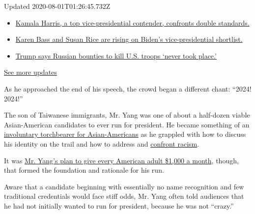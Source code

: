 Updated 2020-08-01T01:26:45.732Z

\begin{itemize}
\tightlist
\item
  \href{https://www.nytimes.com/2020/07/31/us/elections/biden-vs-trump.html?action=click\&pgtype=Article\&state=default\&region=MAIN_CONTENT_1\&context=storylines_live_updates\#link-29fdff45}{Kamala
  Harris, a top vice-presidential contender, confronts double
  standards.}
\item
  \href{https://www.nytimes.com/2020/07/31/us/elections/biden-vs-trump.html?action=click\&pgtype=Article\&state=default\&region=MAIN_CONTENT_1\&context=storylines_live_updates\#link-13ec3d9c}{Karen
  Bass and Susan Rice are rising on Biden's vice-presidential
  shortlist.}
\item
  \href{https://www.nytimes.com/2020/07/31/us/elections/biden-vs-trump.html?action=click\&pgtype=Article\&state=default\&region=MAIN_CONTENT_1\&context=storylines_live_updates\#link-49e9a016}{Trump
  says Russian bounties to kill U.S. troops `never took place.'}
\end{itemize}

\href{https://www.nytimes.com/2020/07/31/us/elections/biden-vs-trump.html?action=click\&pgtype=Article\&state=default\&region=MAIN_CONTENT_1\&context=storylines_live_updates}{See
more updates}

As he approached the end of his speech, the crowd began a different
chant: ``2024! 2024!''

The son of Taiwanese immigrants, Mr. Yang was one of about a half-dozen
viable Asian-American candidates to ever run for president. He became
something of an
\href{https://www.nytimes.com/2019/12/19/us/politics/Andrew-Yang-2020-Democrats-Debate.html}{involuntary
torchbearer for Asian-Americans} as he grappled with how to discuss his
identity on the trail and how to address and
\href{https://www.nytimes.com/2019/09/17/us/politics/shane-gillis-snl-andrew-yang.html?action=click\&module=RelatedLinks\&pgtype=Article}{confront
racism}.

It was
\href{https://www.nytimes.com/2019/06/27/us/politics/who-is-andrew-yang.html}{Mr.
Yang's plan to give every American adult \$1,000 a month}, though, that
formed the foundation and rationale for his run.

Aware that a candidate beginning with essentially no name recognition
and few traditional credentials would face stiff odds, Mr. Yang often
told audiences that he had not initially wanted to run for president,
because he was not ``crazy.''

